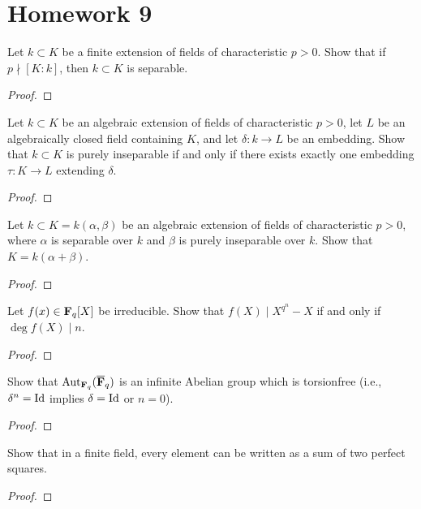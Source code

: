 \section{Homework 9}
\begin{problem}
Let $k\subset K$ be a finite extension of fields of characteristic
$p>0$. Show that if $p\nmid [K:k]$, then $k\subset K$ is separable.
\end{problem}
\begin{proof}
\end{proof}

\begin{problem}
Let $k\subset K$ be an algebraic extension of fields of characteristic
$p>0$, let $L$ be an algebraically closed field containing $K$, and let
$\delta\colon k\to L$ be an embedding. Show that $k\subset K$ is purely
inseparable if and only if there exists exactly one embedding $\tau\colon
K\to L$ extending $\delta$.
\end{problem}
\begin{proof}
\end{proof}

\begin{problem}
Let $k\subset K=k(\alpha,\beta)$ be an algebraic extension of fields of
characteristic $p>0$, where $\alpha$ is separable over $k$ and $\beta$ is
purely inseparable over $k$. Show that $K=k(\alpha+\beta)$.
\end{problem}
\begin{proof}
\end{proof}

\begin{problem}
Let $f(x)\in\mathbf{F}_q[X]$ be irreducible. Show that $f(X)\mid X^{q^n}-X$ if
and only if $\deg f(X)\mid n$.
\end{problem}
\begin{proof}
\end{proof}

\begin{problem}
Show that $\operatorname{Aut}_{\mathbf{F}_q}(\overline{\mathbf{F}}_q)$ is an infinite Abelian group
which is torsionfree (i.e., $\delta^n=\operatorname{Id}$ implies $\delta=\operatorname{Id}$ or $n=0$).
\end{problem}
\begin{proof}
\end{proof}

\begin{problem}
Show that in a finite field, every element can be written as a sum of two
perfect squares.
\end{problem}
\begin{proof}
\end{proof}


